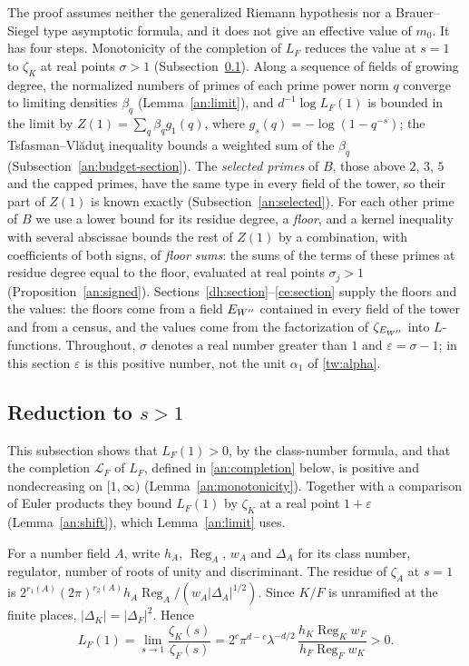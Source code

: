 The proof assumes neither the generalized Riemann hypothesis nor a
Brauer--Siegel type asymptotic formula, and it does not give an effective
value of $m_0$. It has four steps. Monotonicity of the completion of $L_F$
reduces the value at $s=1$ to $\zeta_K$ at real points $\sigma>1$
(Subsection~\ref{an:reduction}). Along a sequence of fields of growing
degree, the normalized numbers of primes of each prime power norm $q$
converge to limiting densities $\beta_q$ (Lemma~\ref{an:limit}), and
$d^{-1}\log L_F(1)$ is bounded in the limit by $Z(1)=\sum_q\beta_qg_1(q)$,
where $g_s(q)=-\log(1-q^{-s})$; the Tsfasman--Vl\u{a}du\c{t} inequality
bounds a weighted sum of the $\beta_q$ (Subsection~\ref{an:budget-section}).
The \emph{selected primes} of $B$, those above $2$, $3$, $5$ and the capped
primes, have the same type in every field of the tower, so their part of
$Z(1)$ is known exactly (Subsection~\ref{an:selected}). For each other prime
of $B$ we use a lower bound for its residue degree, a \emph{floor}, and a
kernel inequality with several abscissae bounds the rest of $Z(1)$ by a
combination, with coefficients of both signs, of \emph{floor sums}: the sums
of the terms of these primes at residue degree equal to the floor, evaluated
at real points $\sigma_j>1$ (Proposition~\ref{an:signed}).
Sections~\ref{dh:section}--\ref{ce:section} supply the floors and the
values: the floors come from a field $E_{W''}$ contained in every field of the
tower and from a census, and the values come from the factorization of
$\zeta_{E_{W''}}$ into $L$-functions. Throughout, $\sigma$ denotes a real number
greater than $1$ and $\varepsilon=\sigma-1$; in this section $\varepsilon$ is
this positive number, not the unit $\alpha_1$ of \eqref{tw:alpha}.

\subsection{\texorpdfstring{Reduction to $s>1$}{Reduction to s > 1}}
\label{an:reduction}
This subsection shows that $L_F(1)>0$, by the class-number formula, and that
the completion $\mathcal L_F$ of $L_F$, defined in \eqref{an:completion}
below, is positive and nondecreasing on
$[1,\infty)$ (Lemma~\ref{an:monotonicity}). Together with a comparison of
Euler products they bound $L_F(1)$ by $\zeta_K$ at a real point
$1+\varepsilon$ (Lemma~\ref{an:shift}), which Lemma~\ref{an:limit} uses.

For a number field $A$, write $h_A$, $\operatorname{Reg}_A$, $w_A$ and
$\Delta_A$ for its class number, regulator, number of roots of unity and
discriminant. The residue of $\zeta_A$ at $s=1$ is
$2^{r_1(A)}(2\pi)^{r_2(A)}h_A\operatorname{Reg}_A/(w_A|\Delta_A|^{1/2})$.
Since $K/F$ is unramified at the finite places, $|\Delta_K|=|\Delta_F|^2$.
Hence
\begin{equation}\label{an:class-formula}
 L_F(1)=\lim_{s\to1}\frac{\zeta_K(s)}{\zeta_F(s)}
 =2^c\pi^{d-c}\lambda^{-d/2}\,
 \frac{h_K\operatorname{Reg}_Kw_F}{h_F\operatorname{Reg}_Fw_K}>0.
\end{equation}

